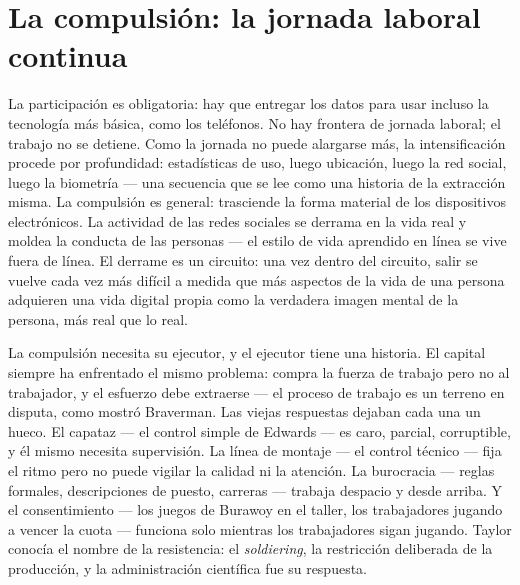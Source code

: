 \documentclass[11pt]{article}
\begin{document}
\section{La compulsión: la jornada laboral continua}

La participación es obligatoria: hay que entregar los datos para usar
incluso la tecnología más básica, como los teléfonos. No hay frontera de
jornada laboral; el trabajo no se detiene. Como la jornada no puede
alargarse más, la intensificación procede por profundidad: estadísticas
de uso, luego ubicación, luego la red social, luego la biometría --- una
secuencia que se lee como una historia de la extracción misma. La
compulsión es general: trasciende la forma material de los dispositivos
electrónicos. La actividad de las redes sociales se derrama en la vida
real y moldea la conducta de las personas --- el estilo de vida
aprendido en línea se vive fuera de línea. El derrame es un circuito:
una vez dentro del circuito, salir se vuelve cada vez más difícil a
medida que más aspectos de la vida de una persona adquieren una vida
digital propia como la verdadera imagen mental de la persona, más real
que lo real.

La compulsión necesita su ejecutor, y el ejecutor tiene una historia.
El capital siempre ha enfrentado el mismo problema: compra la fuerza de
trabajo pero no al trabajador, y el esfuerzo debe extraerse --- el
proceso de trabajo es un terreno en disputa, como mostró Braverman. Las
viejas respuestas dejaban cada una un hueco. El capataz --- el control
simple de Edwards --- es caro, parcial, corruptible, y él mismo necesita
supervisión. La línea de montaje --- el control técnico --- fija el
ritmo pero no puede vigilar la calidad ni la atención. La burocracia
--- reglas formales, descripciones de puesto, carreras --- trabaja
despacio y desde arriba. Y el consentimiento --- los juegos de Burawoy
en el taller, los trabajadores jugando a vencer la cuota --- funciona
solo mientras los trabajadores sigan jugando. Taylor conocía el nombre
de la resistencia: el \emph{soldiering}, la restricción deliberada de la
producción, y la administración científica fue su respuesta.
\end{document}

